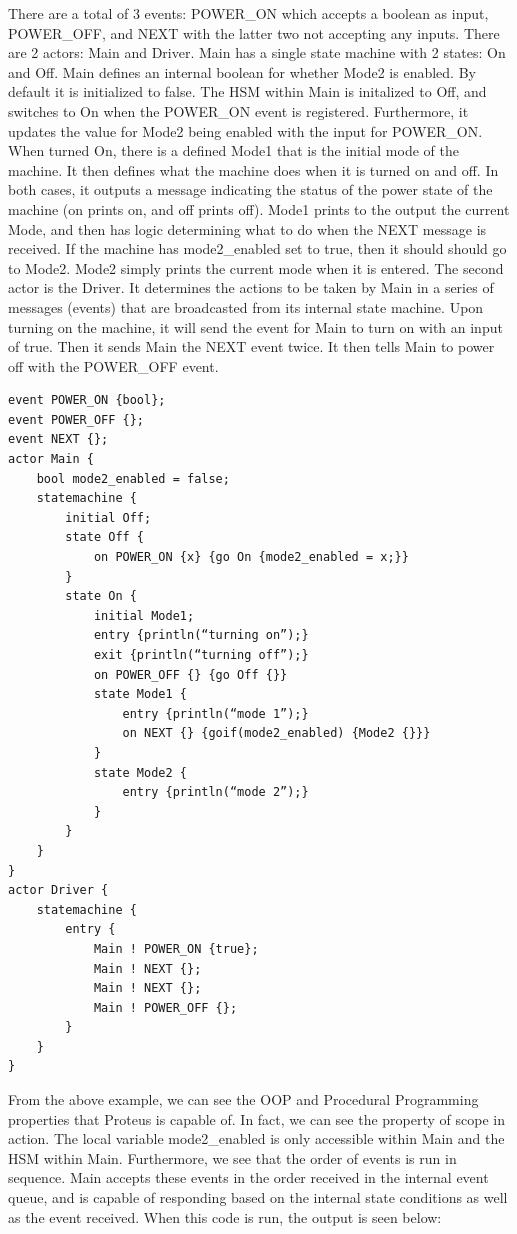 There are a total of 3 events: POWER\_ON which accepts a boolean as input, POWER\_OFF, and NEXT with the latter two not accepting any inputs.
There are 2 actors: Main and Driver.
Main has a single state machine with 2 states: On and Off.
Main defines an internal boolean for whether Mode2 is enabled.
By default it is initialized to false.
The HSM within Main is initalized to Off, and switches to On when the POWER\_ON event is registered.
Furthermore, it updates the value for Mode2 being enabled with the input for POWER\_ON.
When turned On, there is a defined Mode1 that is the initial mode of the machine.
It then defines what the machine does when it is turned on and off.
In both cases, it outputs a message indicating the status of the power state of the machine (on prints on, and off prints off).
Mode1 prints to the output the current Mode, and then has logic determining what to do when the NEXT message is received.
If the machine has mode2\_enabled set to true, then it should should go to Mode2.
Mode2 simply prints the current mode when it is entered.
The second actor is the Driver.
It determines the actions to be taken by Main in a series of messages (events) that are broadcasted from its internal state machine.
Upon turning on the machine, it will send the event for Main to turn on with an input of true.
Then it sends Main the NEXT event twice.
It then tells Main to power off with the POWER\_OFF event.

\begin{verbatim}
event POWER_ON {bool};
event POWER_OFF {};
event NEXT {};
actor Main {
    bool mode2_enabled = false;
    statemachine {
        initial Off;
        state Off {
            on POWER_ON {x} {go On {mode2_enabled = x;}}
        }
        state On {
            initial Mode1;
            entry {println(“turning on”);}
            exit {println(“turning off”);}
            on POWER_OFF {} {go Off {}}
            state Mode1 {
                entry {println(“mode 1”);}
                on NEXT {} {goif(mode2_enabled) {Mode2 {}}}
            }
            state Mode2 {
                entry {println(“mode 2”);}
            }
        }
    }
}
actor Driver {
    statemachine {
        entry {
            Main ! POWER_ON {true};
            Main ! NEXT {};
            Main ! NEXT {};
            Main ! POWER_OFF {};
        }
    }
}
\end{verbatim}

From the above example, we can see the OOP and Procedural Programming properties that Proteus is capable of.
In fact, we can see the property of scope in action.
The local variable mode2\_enabled is only accessible within Main and the HSM within Main.
Furthermore, we see that the order of events is run in sequence.
Main accepts these events in the order received in the internal event queue, and is capable of responding based on the internal state conditions as well as the event received.
When this code is run, the output is seen below:

